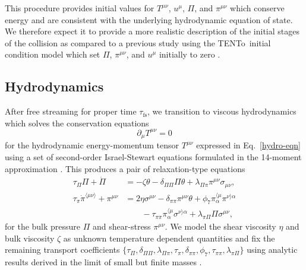 \documentclass[aps,prc,reprint,amsmath,nofootinbib]{revtex4-1}
\newcommand{\trento}{T\raisebox{-0.5ex}{R}ENTo}
\newcommand{\taufs}{\tau_\text{fs}}
\begin{document}
This procedure provides initial values for $T^{\mu\nu}$, $u^\mu$, $\Pi$, and $\pi^{\mu\nu}$ which conserve energy and are consistent with the underlying hydrodynamic equation of state.
We therefore expect it to provide a more realistic description of the initial stages of the collision as compared to a previous study using the \trento\ initial condition model which set $\Pi$, $\pi^{\mu\nu}$, and $u^\mu$ initially to zero \cite{Bernhard:2016tnd}.

\subsection{Hydrodynamics}

After free streaming for proper time $\taufs$, we transition to viscous hydrodynamics which solves the conservation equations
\begin{equation}
  \label{eq:continuity}
  \partial_\mu T^{\mu\nu} = 0
\end{equation}
for the hydrodynamic energy-momentum tensor $T^{\mu\nu}$ expressed in Eq.~\eqref{hydro-eqn} using a set of second-order Israel-Stewart equations formulated in the 14-moment approximation
\cite{Israel:1979wp, Israel:1976aa, Denicol:2012cn, Denicol:2010xn}.
This produces a pair of relaxation-type equations
\begin{subequations}
  \label{eq:relaxation}
  \begin{align}
    \tau_\Pi \Pi + \dot{\Pi} &=
      - \zeta \theta - \delta_{\Pi\Pi} \Pi\theta
      + \lambda_{\Pi\pi} \pi^{\mu\nu} \sigma_{\mu\nu}, \\[1ex]
    \tau_\pi \dot{\pi}^{\langle \mu\nu \rangle} + \pi^{\mu\nu} &=
      2\eta\sigma^{\mu\nu} - \delta_{\pi\pi} \pi^{\mu\nu} \theta
      + \phi_7 \pi_\alpha^{\langle \mu} \pi^{\nu \rangle \alpha} \nonumber \\
      &\qquad {} - \tau_{\pi\pi} \pi_\alpha^{\langle \mu}\sigma^{\nu \rangle \alpha}
      + \lambda_{\pi\Pi} \Pi \sigma^{\mu\nu},
  \end{align}
\end{subequations}
for the bulk pressure $\Pi$ and shear-stress $\pi^{\mu\nu}$.
We model the shear viscosity $\eta$ and bulk viscosity $\zeta$ as unknown temperature dependent quantities and fix the remaining transport coefficients $\{\tau_\Pi, \delta_{\Pi\Pi}, \lambda_{\Pi\pi}, \tau_\pi, \delta_{\pi\pi}, \phi_7, \tau_{\pi\pi}, \lambda_{\pi\Pi}\}$ using analytic results derived in the limit of small but finite masses \cite{Denicol:2014vaa}.
\end{document}
